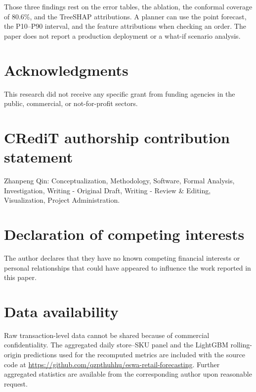 \documentclass[review,authoryear]{elsarticle}
\begin{document}
Those three findings rest on the error tables, the ablation, the conformal coverage of 80.6\%, and the TreeSHAP attributions. A planner can use the point forecast, the P10--P90 interval, and the feature attributions when checking an order. The paper does not report a production deployment or a what-if scenario analysis.

\section*{Acknowledgments}

This research did not receive any specific grant from funding agencies in the public, commercial, or not-for-profit sectors.

\section*{CRediT authorship contribution statement}

Zhanpeng Qin: Conceptualization, Methodology, Software, Formal Analysis, Investigation, Writing - Original Draft, Writing - Review \& Editing, Visualization, Project Administration.

\section*{Declaration of competing interests}

The author declares that they have no known competing financial interests or personal relationships that could have appeared to influence the work reported in this paper.

\section*{Data availability}

Raw transaction-level data cannot be shared because of commercial confidentiality. The aggregated daily store--SKU panel and the LightGBM rolling-origin predictions used for the recomputed metrics are included with the source code at \url{https://github.com/qzpthuhhu/eswa-retail-forecasting}. Further aggregated statistics are available from the corresponding author upon reasonable request.
\end{document}
